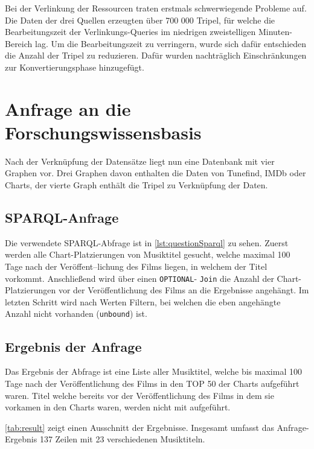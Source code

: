 \documentclass[parskip]{scrartcl}
\begin{document}
Bei der Verlinkung der Ressourcen traten erstmals schwerwiegende Probleme auf. Die Daten der drei Quellen erzeugten über 700 000 Tripel, für welche die Bearbeitungszeit der Verlinkungs-Queries im niedrigen zweistelligen  Minuten-Bereich lag. Um die Bearbeitungszeit zu verringern, wurde sich dafür entschieden die Anzahl der Tripel zu reduzieren. Dafür wurden nachträglich Einschränkungen zur Konvertierungsphase hinzugefügt.

\section{Anfrage an die Forschungswissensbasis}

Nach der Verknüpfung der Datensätze liegt nun eine Datenbank mit vier Graphen vor. Drei Graphen davon enthalten die Daten von Tunefind, IMDb oder Charts, der vierte Graph enthält die Tripel zu Verknüpfung der Daten.

\subsection{SPARQL-Anfrage}

Die verwendete SPARQL-Abfrage ist in \autoref{lst:questionSparql} zu sehen. Zuerst werden alle Chart-Platzierungen von Musiktitel gesucht, welche maximal 100 Tage nach der Veröffent--lichung des Films liegen, in welchem der Titel vorkommt. Anschließend wird über einen \texttt{OPTIONAL}- \texttt{Join} die Anzahl der Chart-Platzierungen vor der Veröffentlichung des Films an die Ergebnisse angehängt. Im letzten Schritt wird nach Werten Filtern, bei welchen die eben angehängte Anzahl nicht vorhanden (\texttt{unbound}) ist.

\subsection{Ergebnis der Anfrage} 

Das Ergebnis der Abfrage ist eine Liste aller Musiktitel, welche bis maximal 100 Tage nach der Veröffentlichung des Films in den TOP 50 der Charts aufgeführt waren. Titel welche bereits vor der Veröffentlichung des Films in dem sie vorkamen in den Charts waren, werden nicht mit aufgeführt.

\autoref{tab:result} zeigt einen Ausschnitt der Ergebnisse. Insgesamt umfasst das Anfrage-Ergebnis 137 Zeilen mit 23 verschiedenen Musiktiteln.
\end{document}
